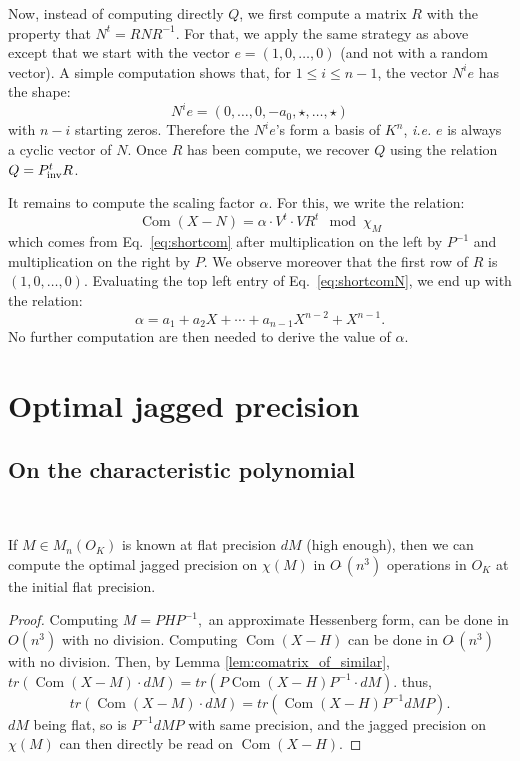 \documentclass{sig-alternate-05-2015}
\DeclareMathOperator{\com}{Com}
\newcommand{\softO}{O\tilde{~}}
\newcommand{\inv}{\text{\rm inv}}
\def\todo#1{\ \!\!{\color{red} #1}}
\begin{document}
Now, instead of computing directly $Q$, we first compute a matrix $R$ 
with the property that $N^t = R N R^{-1}$. For that, we apply the same
strategy as above except that we start with the vector $e = (1, 0, 
\ldots, 0)$ (and not with a random vector). A simple computation shows
that, for $1 \leq i \leq n{-}1$, the vector $N^i e$ has the shape:
$$N^i e = (0, \ldots, 0, -a_0, \star, \ldots, \star)$$
with $n{-}i$ starting zeros. Therefore the $N^i e$'s form a basis of
$K^n$, \emph{i.e.} $e$ is always a cyclic vector of $N$. Once $R$ has
been compute, we recover $Q$ using the relation $Q = P_\inv^t R$.

It remains to compute the scaling factor $\alpha$. For this, we write
the relation:
\begin{equation}
\label{eq:shortcomN}
\com(X{-}N) = \alpha \cdot V^t \cdot V R^t \mod \chi_M
\end{equation}
which comes from Eq.~\eqref{eq:shortcom} after multiplication on the 
left by $P^{-1}$ and multiplication on the right by $P$. We observe
moreover that the first row of $R$ is $(1, 0, \ldots, 0)$. Evaluating
the top left entry of Eq.~\eqref{eq:shortcomN}, we end up with the 
relation:
$$\alpha = a_1 + a_2 X + \cdots + a_{n-1} X^{n-2} + X^{n-1}.$$
No further computation are then needed to derive the value of $\alpha$.

\section{Optimal jagged precision}

\subsection{On the characteristic polynomial}

\todo{Reorganize...}

\begin{prop} \label{prop:optimal_flat}
If $M \in M_n(O_K)$ is known at flat precision $dM$ (high enough), then 
we can compute the optimal jagged precision on $\chi (M)$
in $\softO (n^3)$ operations in $O_K$ at the initial flat precision.
\end{prop}
\begin{proof}
Computing $M=PHP^{-1},$ an approximate Hessenberg form, can be done in
$O(n^3)$ with no division.
Computing $\com (X-H)$ can be done in $\softO (n^3)$ with no division.
Then, by Lemma \ref{lem:comatrix_of_similar}, $tr(\com (X-M) \cdot dM)=tr(P\com (X-H)P^{-1} \cdot dM).$
thus, \[tr(\com (X-M) \cdot dM)=tr(\com (X-H) P^{-1}  dM P). \]
$dM$ being flat, so is $P^{-1}  dM P$ with same precision, 
and the jagged precision on $\chi (M)$ can then directly be read on $\com (X-H).$
\end{proof}
\end{document}
